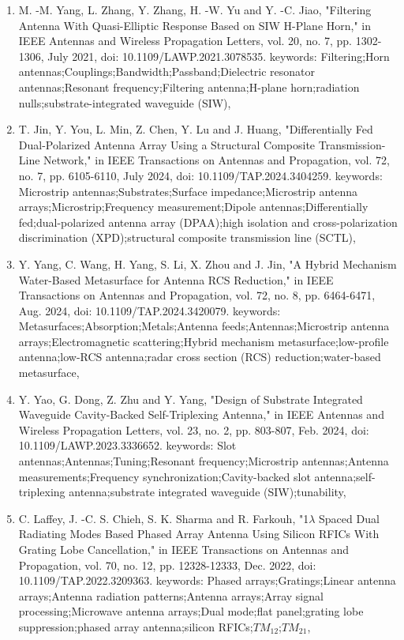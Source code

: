 \documentclass[12pt]{article}
\begin{document}
\begin{enumerate}
		\item M. -M. Yang, L. Zhang, Y. Zhang, H. -W. Yu and Y. -C. Jiao, "Filtering Antenna With Quasi-Elliptic Response Based on SIW H-Plane Horn," in IEEE Antennas and Wireless Propagation Letters, vol. 20, no. 7, pp. 1302-1306, July 2021, doi: 10.1109/LAWP.2021.3078535.
keywords: {Filtering;Horn antennas;Couplings;Bandwidth;Passband;Dielectric resonator antennas;Resonant frequency;Filtering antenna;H-plane horn;radiation nulls;substrate-integrated waveguide (SIW)},

		\item T. Jin, Y. You, L. Min, Z. Chen, Y. Lu and J. Huang, "Differentially Fed Dual-Polarized Antenna Array Using a Structural Composite Transmission-Line Network," in IEEE Transactions on Antennas and Propagation, vol. 72, no. 7, pp. 6105-6110, July 2024, doi: 10.1109/TAP.2024.3404259.
keywords: {Microstrip antennas;Substrates;Surface impedance;Microstrip antenna arrays;Microstrip;Frequency measurement;Dipole antennas;Differentially fed;dual-polarized antenna array (DPAA);high isolation and cross-polarization discrimination (XPD);structural composite transmission line (SCTL)},

		\item Y. Yang, C. Wang, H. Yang, S. Li, X. Zhou and J. Jin, "A Hybrid Mechanism Water-Based Metasurface for Antenna RCS Reduction," in IEEE Transactions on Antennas and Propagation, vol. 72, no. 8, pp. 6464-6471, Aug. 2024, doi: 10.1109/TAP.2024.3420079.
keywords: {Metasurfaces;Absorption;Metals;Antenna feeds;Antennas;Microstrip antenna arrays;Electromagnetic scattering;Hybrid mechanism metasurface;low-profile antenna;low-RCS antenna;radar cross section (RCS) reduction;water-based metasurface},

		\item Y. Yao, G. Dong, Z. Zhu and Y. Yang, "Design of Substrate Integrated Waveguide Cavity-Backed Self-Triplexing Antenna," in IEEE Antennas and Wireless Propagation Letters, vol. 23, no. 2, pp. 803-807, Feb. 2024, doi: 10.1109/LAWP.2023.3336652.
keywords: {Slot antennas;Antennas;Tuning;Resonant frequency;Microstrip antennas;Antenna measurements;Frequency synchronization;Cavity-backed slot antenna;self-triplexing antenna;substrate integrated waveguide (SIW);tunability},

		\item C. Laffey, J. -C. S. Chieh, S. K. Sharma and R. Farkouh, "1$\lambda$ Spaced Dual Radiating Modes Based Phased Array Antenna Using Silicon RFICs With Grating Lobe Cancellation," in IEEE Transactions on Antennas and Propagation, vol. 70, no. 12, pp. 12328-12333, Dec. 2022, doi: 10.1109/TAP.2022.3209363.
keywords: {Phased arrays;Gratings;Linear antenna arrays;Antenna radiation patterns;Antenna arrays;Array signal processing;Microwave antenna arrays;Dual mode;flat panel;grating lobe suppression;phased array antenna;silicon RFICs;$TM_{12}$;$TM_{21}$},


\end{enumerate}
\end{document}
